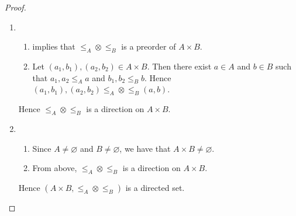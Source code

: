\documentclass{book}
\begin{document}
	\begin{proof}\
		\begin{enumerate}
			\item 
			\begin{enumerate}
				\item {} implies that $\leq_A \otimes \leq_B$ is a preorder of $A \times B$.
				\item Let $(a_1, b_1), (a_2, b_2) \in A \times B$. Then there exist $a \in A$ and $b \in B$ such that $a_1, a_2 \leq_A a$ and $b_1, b_2 \leq_B b$. Hence $(a_1, b_1), (a_2, b_2) \leq_A \otimes \leq_B (a, b)$.
			\end{enumerate}
			Hence $\leq_A \otimes \leq_B$ is a direction on $A \times B$.
			\item 
			\begin{enumerate}
				\item Since $A \neq \varnothing$ and $B \neq \varnothing$, we have that $A \times B \neq \varnothing$.
				\item From above, $\leq_A \otimes \leq_B$ is a direction on $A \times B$. 
			\end{enumerate}
			Hence $(A \times B, \leq_A \otimes \leq_B)$ is a directed set.
		\end{enumerate}
	\end{proof}
	
	
	
	
	
	
	
	
	
	
	
	
	
	
	
	
	
	
	
	
	
	
	
	
	
	
	
	
	
	
	
	
	
	
	
	
	
	
	
	
	
	
	
	
	
	
	
	
	
	
	
	
	
	
	
	
	
\end{document}
